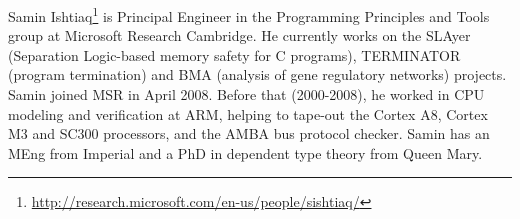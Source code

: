 \documentclass[a4paper,11pt]{article}
\begin{document}
Samin
Ishtiaq\footnote{\url{http://research.microsoft.com/en-us/people/sishtiaq/}}
is Principal Engineer in the Programming Principles and Tools group at
Microsoft Research Cambridge. He currently works on the SLAyer
(Separation Logic-based memory safety for C programs), TERMINATOR
(program termination) and BMA (analysis of gene regulatory networks)
projects. Samin joined MSR in April 2008. Before that (2000-2008), he
worked in CPU modeling and verification at ARM, helping to tape-out
the Cortex A8, Cortex M3 and SC300 processors, and the AMBA bus
protocol checker. Samin has an MEng from Imperial and a PhD in
dependent type theory from Queen Mary.



\end{document}
